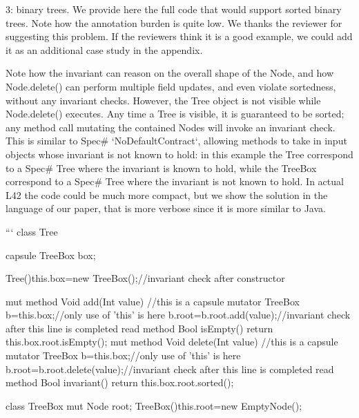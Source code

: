 3: binary trees. We provide here the full code that would support sorted binary trees.
Note how the annotation burden is quite low. We thanks the reviewer for suggesting this problem.
If the reviewers think it is a good example, we could add it as an additional case study in the appendix.

Note how the invariant can reason on the overall shape of the Node, and
how Node.delete() can perform multiple field updates,
and even violate sortedness, without any invariant checks.
However, the Tree object is not visible while Node.delete() executes.
Any time a Tree is visible, it is guaranteed to be sorted;
any method call mutating the contained Nodes will invoke an invariant check.
This is similar to Spec# `NoDefaultContract`, allowing methods to take in input
objects whose invariant is not known to hold:
in this example the Tree correspond to a Spec# Tree where the invariant
is known to hold, while the TreeBox correspond to a Spec# Tree where the invariant is not known to hold.
In actual L42 the code could be much more compact, but we show the solution in the language of our paper,
that is more verbose since it is more similar to Java.

``` 
class Tree {
  capsule TreeBox box;

  Tree(){this.box=new TreeBox();}//invariant check after constructor

  mut method Void add(Int value) {//this is a capsule mutator
    TreeBox b=this.box;//only use of 'this' is here
    b.root=b.root.add(value);//invariant check after this line is completed
  }
  read method Bool isEmpty() {return this.box.root.isEmpty();}
  mut method Void delete(Int value) {//this is a capsule mutator
    TreeBox b=this.box;//only use of 'this' is here
     b.root=b.root.delete(value);//invariant check after this line is completed
  }
  read method Bool invariant() {return this.box.root.sorted();}
}

class TreeBox{ mut Node root; TreeBox(){this.root=new EmptyNode();} }

